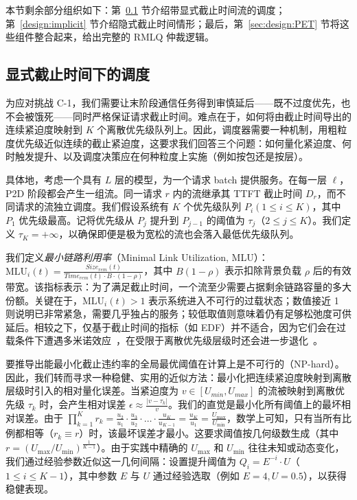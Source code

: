 本节剩余部分组织如下：第~\ref{design:explicit} 节介绍带显式截止时间流的调度；第~\ref{design:implicit} 节介绍隐式截止时间情形；最后，第~\ref{sec:design:PET} 节将这些组件整合起来，给出完整的 RMLQ 仲裁逻辑。

\subsection{显式截止时间下的调度}\label{design:explicit}

为应对挑战 C-1，我们需要让末阶段通信任务得到审慎延后——既不过度优先，也不会被饿死——同时严格保证请求截止时间。难点在于，如何将由截止时间导出的连续紧迫度映射到 $K$ 个离散优先级队列上。因此，调度器需要一种机制，用粗粒度优先级近似连续的截止紧迫度，这要求我们回答三个问题：如何量化紧迫度、何时触发提升、以及调度决策应在何种粒度上实施（例如按包还是按层）。

具体地，考虑一个具有 $L$ 层的模型，为一个请求 batch 提供服务。在每一层 $\ell$，P2D 阶段都会产生一组流。同一请求 $r$ 内的流继承其 TTFT 截止时间 $D_r$，而不同请求的流独立调度。我们假设系统有 $K$ 个优先级队列 $P_i(1\leq i \leq K)$，其中 $P_1$ 优先级最高。记将优先级从 $P_j$ 提升到 $P_{j-1}$ 的阈值为 $\tau_j$（$2 \le j \le K$）。我们定义 $\tau_K = +\infty$，以确保即便是极为宽松的流也会落入最低优先级队列。

 我们定义\emph{最小链路利用率}（Minimal Link Utilization, MLU）：$\mathrm{MLU}_i(t)=\frac{\textit{Size}_{rem}(t)}{\textit{Time}_{rem}(t)\cdot B \cdot (1-\rho)}$，其中 $B(1-\rho)$ 表示扣除背景负载 $\rho$ 后的有效带宽。该指标表示：为了满足截止时间，一个流至少需要占据剩余链路容量的多大份额。关键在于，$\mathrm{MLU}_i(t) > 1$ 表示系统进入不可行的过载状态；数值接近 1 则说明已非常紧急，需要几乎独占的服务；较低取值则意味着仍有足够松弛度可供延后。相较之下，仅基于截止时间的指标（如 EDF）并不适合，因为它们会在过载条件下遭遇多米诺效应~\cite{buttazzo1995value}，在受限于离散优先级层级时还会进一步退化~\cite{buttazzo2005rate}。

 要推导出能最小化截止违约率的全局最优阈值在计算上是不可行的（NP-hard）。因此，我们转而寻求一种稳健、实用的近似方法：最小化把连续紧迫度映射到离散层级时引入的相对量化误差。当紧迫度为 $v \in [U_{min},U_{max}]$ 的流被映射到离散优先级 $\tau_k$ 时，会产生相对误差 $\epsilon \approx \frac{|v - \tau_k|}{v}$。我们的直觉是最小化所有阈值上的最坏相对误差。由于 $\prod_{k=1}^{K} r_k = \frac{u_2}{u_1} \cdot \frac{u_3}{u_2} \cdot \dots \cdot \frac{u_K}{u_{K-1}} = \frac{u_K}{u_1} = \frac{U_{\max}}{U_{\min}}$，数学上可知，只有当所有比例都相等（$r_k \equiv r$）时，该最坏误差才最小。这要求阈值按几何级数生成（其中 $r =(U_{\max}/U_{\min})^{\frac{1}{K-1}}$）。由于实践中精确的 $U_{\max}$ 和 $U_{\min}$ 往往未知或动态变化，我们通过经验参数近似这一几何间隔：设置提升阈值为 $Q_i = E^{-i}\cdot U$（$1\le i\le K-1$），其中参数 $E$ 与 $U$ 通过经验选取（例如 $E=4, U=0.5$），以获得稳健表现。

